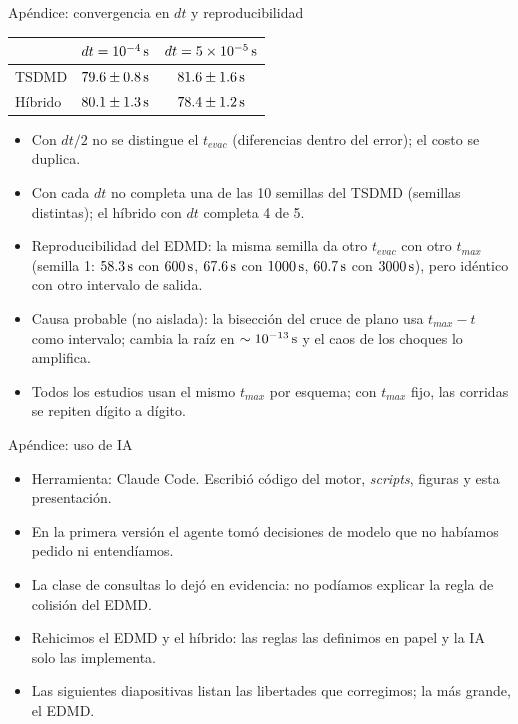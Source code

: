 \begin{frame}{Apéndice: convergencia en $dt$ y reproducibilidad}
  \footnotesize
  \begin{center}
    \begin{tabular}{lcc}
      \toprule
      & $dt = 10^{-4}\,\mathrm{s}$ & $dt = 5\times10^{-5}\,\mathrm{s}$ \\ \midrule
      TSDMD   & $79.6 \pm 0.8\,\mathrm{s}$ & $81.6 \pm 1.6\,\mathrm{s}$ \\
      Híbrido & $80.1 \pm 1.3\,\mathrm{s}$ & $78.4 \pm 1.2\,\mathrm{s}$ \\
      \bottomrule
    \end{tabular}
  \end{center}
  \begin{itemize}
    \item Con $dt/2$ no se distingue el $t_{evac}$ (diferencias dentro del error); el costo se duplica.
    \item Con cada $dt$ no completa una de las 10 semillas del TSDMD (semillas distintas); el híbrido con $dt$ completa 4 de 5.
    \item Reproducibilidad del EDMD: la misma semilla da otro $t_{evac}$ con otro $t_{max}$
          (semilla 1: $58.3\,\mathrm{s}$ con $600\,\mathrm{s}$, $67.6\,\mathrm{s}$ con $1000\,\mathrm{s}$, $60.7\,\mathrm{s}$ con $3000\,\mathrm{s}$),
          pero idéntico con otro intervalo de salida.
    \item Causa probable (no aislada): la bisección del cruce de plano usa $t_{max}-t$ como intervalo;
          cambia la raíz en $\sim10^{-13}\,\mathrm{s}$ y el caos de los choques lo amplifica.
    \item Todos los estudios usan el mismo $t_{max}$ por esquema; con $t_{max}$ fijo, las corridas se repiten dígito a dígito.
  \end{itemize}
\end{frame}

\begin{frame}{Apéndice: uso de IA}
  \begin{itemize}
    \item Herramienta: Claude Code. Escribió código del motor, \emph{scripts}, figuras y esta presentación.
    \item En la primera versión el agente tomó decisiones de modelo que no habíamos pedido ni entendíamos.
    \item La clase de consultas lo dejó en evidencia: no podíamos explicar la regla de colisión del EDMD.
    \item Rehicimos el EDMD y el híbrido: las reglas las definimos en papel y la IA solo las implementa.
    \item Las siguientes diapositivas listan las libertades que corregimos; la más grande, el EDMD.
  \end{itemize}
\end{frame}


